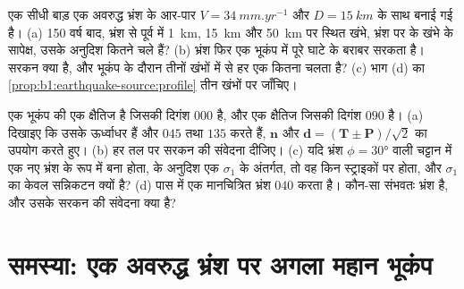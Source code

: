 \begin{exercise}[$\star\star\star$]
\label{exo:b1:earthquake-source:11}
एक सीधी बाड़ एक अवरुद्ध  भ्रंश के आर-पार $V =
\qty{34}{mm.yr^{-1}}$ और $D = \qty{15}{km}$ के साथ बनाई गई है। (a) 150 वर्ष बाद, भ्रंश से पूर्व में \qty{1}{km}, \qty{15}{km} और \qty{50}{km} पर स्थित खंभे, भ्रंश पर के खंभे के सापेक्ष, उसके अनुदिश कितने चले हैं? (b) भ्रंश फिर एक भूकंप में पूरे घाटे के बराबर सरकता है। सरकन क्या है, और भूकंप के दौरान तीनों खंभों में से हर एक कितना चलता है? (c) भाग (d) का \cref{prop:b1:earthquake-source:profile} तीन खंभों पर जाँचिए।
\end{exercise}

\begin{exercise}[$\star\star\star$]
\label{exo:b1:earthquake-source:12}
एक भूकंप की एक क्षैतिज  है जिसकी दिगंश $000$ है, और एक क्षैतिज  जिसकी दिगंश $090$ है। (a) दिखाइए कि उसके  ऊर्ध्वाधर हैं और $045$ तथा $135$  करते हैं, $\mathbf n$ और $\mathbf d = (\mathbf T \pm \mathbf P)/\sqrt2$ का उपयोग करते हुए। (b) हर तल पर सरकन की संवेदना दीजिए। (c) यदि भ्रंश $\phi = \ang{30}$ वाली चट्टान में एक नए भ्रंश के रूप में बना होता,  के अनुदिश एक $\sigma_1$ के अंतर्गत, तो वह किन स्ट्राइकों पर होता, और  $\sigma_1$ का केवल सन्निकटन क्यों है? (d) पास में एक मानचित्रित भ्रंश $040$  करता है। कौन-सा  संभवतः भ्रंश है, और उसके सरकन की संवेदना क्या है?
\end{exercise}

\section{समस्या: एक अवरुद्ध भ्रंश पर अगला महान भूकंप}

